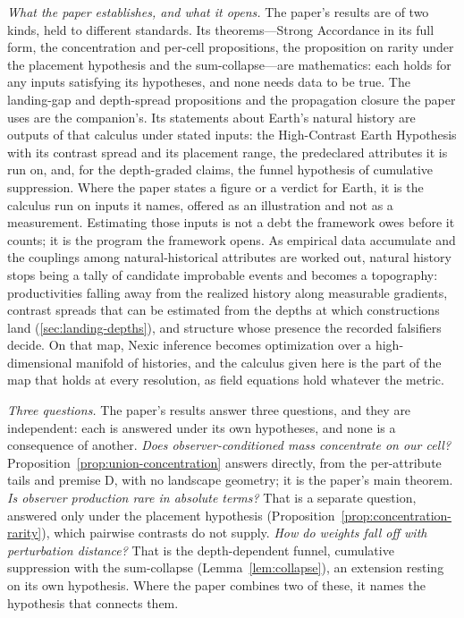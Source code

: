 \documentclass[11pt]{article}
\theoremstyle{definition}
\begin{document}
\noindent\emph{What the paper establishes, and what it opens.} The paper's results are of two kinds, held to different standards. Its theorems---Strong Accordance in its full form, the concentration and per-cell propositions, the proposition on rarity under the placement hypothesis and the sum-collapse---are mathematics: each holds for any inputs satisfying its hypotheses, and none needs data to be true. The landing-gap and depth-spread propositions and the propagation closure the paper uses are the companion's. Its statements about Earth's natural history are outputs of that calculus under stated inputs: the High-Contrast Earth Hypothesis with its contrast spread and its placement range, the predeclared attributes it is run on, and, for the depth-graded claims, the funnel hypothesis of cumulative suppression. Where the paper states a figure or a verdict for Earth, it is the calculus run on inputs it names, offered as an illustration and not as a measurement. Estimating those inputs is not a debt the framework owes before it counts; it is the program the framework opens. As empirical data accumulate and the couplings among natural-historical attributes are worked out, natural history stops being a tally of candidate improbable events and becomes a topography: productivities falling away from the realized history along measurable gradients, contrast spreads that can be estimated from the depths at which constructions land (\autoref{sec:landing-depths}), and structure whose presence the recorded falsifiers decide. On that map, Nexic inference becomes optimization over a high-dimensional manifold of histories, and the calculus given here is the part of the map that holds at every resolution, as field equations hold whatever the metric.

\noindent\emph{Three questions.} The paper's results answer three questions, and they are independent: each is answered under its own hypotheses, and none is a consequence of another. \emph{Does observer-conditioned mass concentrate on our cell?} Proposition~\ref{prop:union-concentration} answers directly, from the per-attribute tails and premise D, with no landscape geometry; it is the paper's main theorem. \emph{Is observer production rare in absolute terms?} That is a separate question, answered only under the placement hypothesis (Proposition~\ref{prop:concentration-rarity}), which pairwise contrasts do not supply. \emph{How do weights fall off with perturbation distance?} That is the depth-dependent funnel, cumulative suppression with the sum-collapse (Lemma~\ref{lem:collapse}), an extension resting on its own hypothesis. Where the paper combines two of these, it names the hypothesis that connects them.
\end{document}
